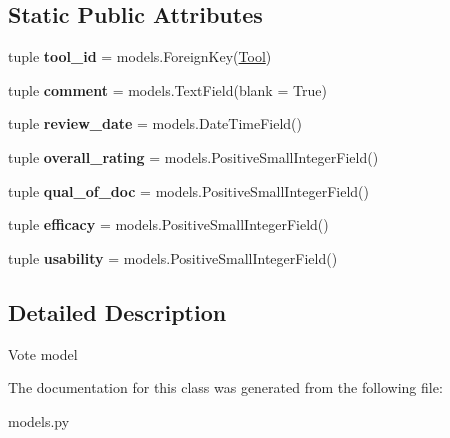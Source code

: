 \subsection*{Static Public Attributes}
\begin{DoxyCompactItemize}
\item 
\hypertarget{classratings_1_1models_1_1Vote_a6d90101efcb95c4ad9b482dbe0ab4f45}{tuple {\bfseries tool\-\_\-id} = models.\-Foreign\-Key(\hyperlink{classratings_1_1models_1_1Tool}{Tool})}\label{classratings_1_1models_1_1Vote_a6d90101efcb95c4ad9b482dbe0ab4f45}

\item 
\hypertarget{classratings_1_1models_1_1Vote_a144209022f3867968a8bc063c61de5dc}{tuple {\bfseries comment} = models.\-Text\-Field(blank = True)}\label{classratings_1_1models_1_1Vote_a144209022f3867968a8bc063c61de5dc}

\item 
\hypertarget{classratings_1_1models_1_1Vote_abab964e4961f5cabc5b562057cd24608}{tuple {\bfseries review\-\_\-date} = models.\-Date\-Time\-Field()}\label{classratings_1_1models_1_1Vote_abab964e4961f5cabc5b562057cd24608}

\item 
\hypertarget{classratings_1_1models_1_1Vote_a668e499a155103447842694cc3c5519b}{tuple {\bfseries overall\-\_\-rating} = models.\-Positive\-Small\-Integer\-Field()}\label{classratings_1_1models_1_1Vote_a668e499a155103447842694cc3c5519b}

\item 
\hypertarget{classratings_1_1models_1_1Vote_aa6d51b455e4177bb442766ccea14b54c}{tuple {\bfseries qual\-\_\-of\-\_\-doc} = models.\-Positive\-Small\-Integer\-Field()}\label{classratings_1_1models_1_1Vote_aa6d51b455e4177bb442766ccea14b54c}

\item 
\hypertarget{classratings_1_1models_1_1Vote_afea6bd04715f329357f0ab948db263bc}{tuple {\bfseries efficacy} = models.\-Positive\-Small\-Integer\-Field()}\label{classratings_1_1models_1_1Vote_afea6bd04715f329357f0ab948db263bc}

\item 
\hypertarget{classratings_1_1models_1_1Vote_a41d3762f8deb83dcb8938fa1115ce740}{tuple {\bfseries usability} = models.\-Positive\-Small\-Integer\-Field()}\label{classratings_1_1models_1_1Vote_a41d3762f8deb83dcb8938fa1115ce740}

\end{DoxyCompactItemize}


\subsection{Detailed Description}
\begin{DoxyVerb}Vote model
\end{DoxyVerb}
 

The documentation for this class was generated from the following file\-:\begin{DoxyCompactItemize}
\item 
models.\-py\end{DoxyCompactItemize}
